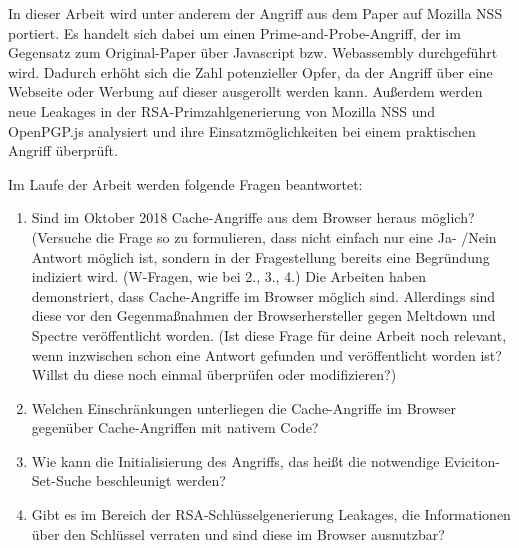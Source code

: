 In dieser Arbeit wird unter anderem der Angriff aus dem Paper \cite{RSAKeyGeneration2} auf Mozilla NSS portiert. Es handelt sich dabei um einen Prime-and-Probe-Angriff, der im Gegensatz zum Original-Paper über Javascript bzw. Webassembly durchgeführt wird. Dadurch erhöht sich die Zahl potenzieller Opfer, da der Angriff über eine Webseite oder Werbung auf dieser ausgerollt werden kann.
Außerdem werden neue Leakages in der RSA-Primzahlgenerierung von Mozilla NSS und OpenPGP.js analysiert und ihre Einsatzmöglichkeiten bei einem praktischen Angriff überprüft.


Im Laufe der Arbeit werden folgende Fragen beantwortet:

\begin{enumerate}
\item Sind im Oktober 2018 Cache-Angriffe aus dem Browser heraus möglich? (Versuche die Frage so zu formulieren, dass nicht einfach nur eine Ja- /Nein Antwort möglich ist, sondern in der Fragestellung bereits eine Begründung indiziert wird. (W-Fragen, wie bei 2., 3., 4.)
Die Arbeiten \cite{TheSpyInTheSandbox,DriveByPaper,ASLROnTheLine} haben demonstriert, dass Cache-Angriffe im Browser möglich sind.
Allerdings sind diese vor den Gegenmaßnahmen der Browserhersteller gegen Meltdown und Spectre veröffentlicht worden. (Ist diese Frage für deine Arbeit noch relevant, wenn inzwischen schon eine Antwort gefunden und veröffentlicht worden ist? Willst du diese noch einmal überprüfen oder modifizieren?)


\item Welchen Einschränkungen unterliegen die Cache-Angriffe im Browser gegenüber Cache-Angriffen mit nativem Code?

\item Wie kann die Initialisierung des Angriffs, das heißt die notwendige Eviciton-Set-Suche beschleunigt werden?

\item Gibt es im Bereich der RSA-Schlüsselgenerierung Leakages, die Informationen über den Schlüssel verraten und sind diese im Browser ausnutzbar?
\end{enumerate}


